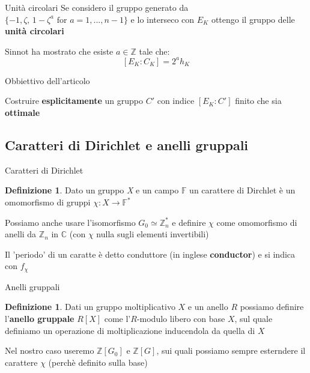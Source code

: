 \documentclass[handout]{beamer}
\theoremstyle{plain}
\theoremstyle{remark}
\theoremstyle{definition}
\newtheorem{deff}[teo]{Definizione}
\newcommand{\Z}{\mathbb{Z}}
\newcommand{\F}{\mathbb{F}}
\newcommand{\C}{\mathbb{C}}
\begin{document}
	\begin{frame}{Unità circolari}
		Se considero il gruppo generato da $ \{ -1 ,  \zeta , \, 1 - \zeta ^a \text{ for } a = 1, ... , n-1 \} $ e lo interseco con $ E_K $ ottengo il gruppo delle \textbf{unità circolari}\pause
		\begin{exampleblock}{}
			Sinnot ha mostrato che esiste $ a \in \Z $ tale che:
			\[ [E_K : C_K] = 2^a h_K\]
			\nocite{SIN}
		\end{exampleblock}
	\end{frame}
	
	\begin{frame}{Obbiettivo dell'articolo}
		\begin{alertblock}{}
			 	Costruire \textbf{esplicitamente} un gruppo  $ C' $ con indice $ [ E_K : C' ] $ finito che sia \textbf{ottimale}
		\end{alertblock}
	\end{frame}
	
\subsection{Caratteri di Dirichlet e anelli gruppali}
	
	\begin{frame}{Caratteri di Dirichlet}
		\begin{deff}
			 	Dato un gruppo \textit{X} e un campo $ \F $ un carattere di Dirchlet è un omomorfismo di gruppi $ \chi :X \to \F ^*  $
		 \end{deff}
		 \pause
		 Possiamo anche usare l'isomorfismo $ G_0 \simeq \Z_n ^ *$ e definire $\chi$ come omomorfismo di anelli da $ \Z_n $ in $ \C $ (con $\chi$ nulla sugli elementi invertibili)
		 \pause
		 \begin{exampleblock}{}
		 Il 'periodo' di un caratte è detto conduttore (in inglese \textbf{conductor}) e si indica con $ f_\chi $
		 \end{exampleblock}
	\end{frame}
	
	\begin{frame}{Anelli gruppali}
		\begin{deff}
			Dati un gruppo moltiplicativo $ X $ e un anello $ R $ possiamo definire l'\textbf{anello gruppale} $ R[X] $ come l'$ R $-modulo libero con base $ X $, sul quale definiamo un operazione di moltiplicazione inducendola da quella di $ X $
		\end{deff}
		\pause
		Nel nostro caso useremo $ \Z [G_0] $ e $ \Z [G] $, sui quali possiamo sempre esterndere il carattere $\chi$ (perchè definito sulla base)
	\end{frame}
	
\end{document}
